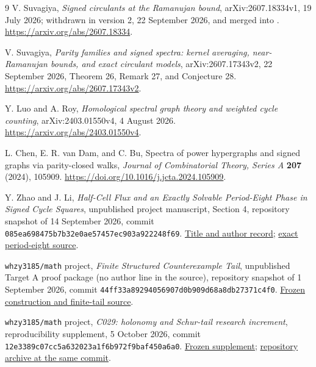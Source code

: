 \documentclass[11pt]{article}
\theoremstyle{remark}\newtheorem{remark}[theorem]{Remark}
\begin{document}
\begin{thebibliography}{9}
\small
{}
V. Suvagiya,
\emph{Signed circulants at the Ramanujan bound},
arXiv:2607.18334v1, 19 July 2026;
withdrawn in version 2, 22 September 2026, and merged into
\cite{Suvagiya2026}.
\url{https://arxiv.org/abs/2607.18334}.

V. Suvagiya,
\emph{Parity families and signed spectra: kernel averaging,
near-Ramanujan bounds, and exact circulant models},
arXiv:2607.17343v2, 22 September 2026,
Theorem 26, Remark 27, and Conjecture 28.
\url{https://arxiv.org/abs/2607.17343v2}.

Y. Luo and A. Roy,
\emph{Homological spectral graph theory and weighted cycle counting},
arXiv:2403.01550v4, 4 August 2026.
\url{https://arxiv.org/abs/2403.01550v4}.

L. Chen, E. R. van Dam, and C. Bu,
Spectra of power hypergraphs and signed graphs via parity-closed walks,
\emph{Journal of Combinatorial Theory, Series A} \textbf{207} (2024),
105909.
\url{https://doi.org/10.1016/j.jcta.2024.105909}.

Y. Zhao and J. Li,
\emph{Half-Cell Flux and an Exactly Solvable Period-Eight Phase in Signed
Cycle Squares}, unpublished project manuscript, Section 4,
repository snapshot of 14 September 2026, commit
\nolinkurl{085ea698475b7b32e0ae57457ec903a922248f69}.
\href{https://github.com/whzy3185/math/blob/085ea698475b7b32e0ae57457ec903a922248f69/research/paper_strengthening/manuscript_period8_jgt/frontmatter_en.tex}{Title and author record};
\href{https://github.com/whzy3185/math/blob/085ea698475b7b32e0ae57457ec903a922248f69/research/paper_strengthening/manuscript_period8_jgt/sections_en/04_period8_exact.tex}{exact period-eight source}.

\texttt{whzy3185/math} project,
\emph{Finite Structured Counterexample Tail}, unpublished Target A
proof package (no author line in the source), repository snapshot of
1 September 2026, commit
\nolinkurl{44ff33a89294056907d0b909d68a8db27371c4f0}.
\href{https://github.com/whzy3185/math/blob/44ff33a89294056907d0b909d68a8db27371c4f0/research/proofs/task54/TARGET_A_FINITE_STRUCTURED_COUNTEREXAMPLE_TAIL.md}{Frozen construction and finite-tail source}.

\texttt{whzy3185/math} project,
\emph{C029: holonomy and Schur-tail research increment},
reproducibility supplement, 5 October 2026, commit
\nolinkurl{12e3389c07cc5a632023a1f6b972f9baf450a6a0}.
\href{https://github.com/whzy3185/math/tree/12e3389c07cc5a632023a1f6b972f9baf450a6a0/research/c029_holonomy_schur_20261005}{Frozen supplement};
\href{https://github.com/whzy3185/math/archive/12e3389c07cc5a632023a1f6b972f9baf450a6a0.zip}{repository archive at the same commit}.


\end{thebibliography}
\end{document}
